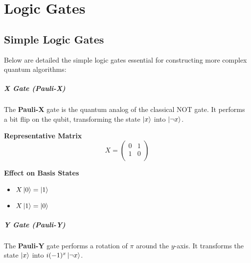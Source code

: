 \chapter{Logic Gates}
\label{appendices:LogicGates}
\section{Simple Logic Gates}
Below are detailed the simple logic gates essential for constructing more complex quantum algorithms:

\paragraph{X Gate (Pauli-X)}

The \textbf{Pauli-X} gate is the quantum analog of the classical NOT gate. It performs a bit flip on the qubit, transforming the state $\ket{x}$ into $\ket{\neg x}$.

\vspace{0.5em}
\begin{minipage}{\textwidth}
    \begin{minipage}[t]{0.45\textwidth}
        \centering
        \textbf{Representative Matrix}\\[0.5em]
        \[
        X = 
        \begin{pmatrix}
        0 & 1 \\
        1 & 0 \\
        \end{pmatrix}
        \]
    \end{minipage}
    \hfill
    \begin{minipage}[t]{0.45\textwidth}
        \centering
        \textbf{Effect on Basis States}\\[0.5em]
        \begin{itemize}
            \item $X\ket{0} = \ket{1}$
            \item $X\ket{1} = \ket{0}$
        \end{itemize}
    \end{minipage}
\end{minipage}

\paragraph{Y Gate (Pauli-Y)}

The \textbf{Pauli-Y} gate performs a rotation of $\pi$ around the $y$-axis. It transforms the state $\ket{x}$ into $i(-1)^x\ket{\neg x}$.

